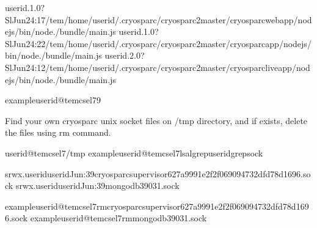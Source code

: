 \documentclass[a4paper,11pt,english]{sphinxmanual}
\begin{document}
\begin{sphinxVerbatim}[commandchars=\\\{\}]
userid.1.0?SlJun24:17/tem/home/userid/.cryosparc/cryosparc2\PYGZus{}master/cryosparc\PYGZus{}webapp/nodejs/bin/node./bundle/main.js
userid.1.0?SlJun24:22/tem/home/userid/.cryosparc/cryosparc2\PYGZus{}master/cryosparc\PYGZus{}app/nodejs/bin/node./bundle/main.js
userid.2.0?SlJun24:12/tem/home/userid/.cryosparc/cryosparc2\PYGZus{}master/cryosparc\PYGZus{}liveapp/nodejs/bin/node./bundle/main.js

exampleuserid@tem\PYGZhy{}cs\PYGZhy{}el7\PYGZdl{}\PYGZgt{}\PYGZhy{}9
\end{sphinxVerbatim}

\sphinxAtStartPar
Find your own cryosparc unix socket files on /tmp directory, and if exists, delete the files using rm command.

\begin{sphinxVerbatim}[commandchars=\\\{\}]
userid@tem\PYGZhy{}cs\PYGZhy{}el7\PYGZdl{}\PYGZgt{}/tmp
exampleuserid@tem\PYGZhy{}cs\PYGZhy{}el7\PYGZdl{}\PYGZgt{}ls\PYGZhy{}algrep\PYGZlt{}userid\PYGZgt{}grepsock

srwx\PYGZhy{}\PYGZhy{}\PYGZhy{}\PYGZhy{}\PYGZhy{}\PYGZhy{}.useriduseridJun:39cryosparc\PYGZhy{}supervisor\PYGZhy{}627a9991e2f2f069094732dfd78d1696.sock
srwx\PYGZhy{}\PYGZhy{}\PYGZhy{}\PYGZhy{}\PYGZhy{}\PYGZhy{}.useriduseridJun:39mongodb\PYGZhy{}39031.sock

exampleuserid@tem\PYGZhy{}cs\PYGZhy{}el7\PYGZdl{}\PYGZgt{}rmcryosparc\PYGZhy{}supervisor\PYGZhy{}627a9991e2f2f069094732dfd78d1696.sock
exampleuserid@tem\PYGZhy{}cs\PYGZhy{}el7\PYGZdl{}\PYGZgt{}rmmongodb\PYGZhy{}39031.sock
\end{sphinxVerbatim}
\end{document}
